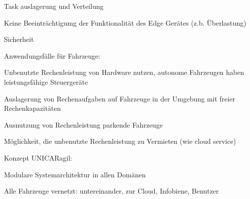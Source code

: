 \begin{notes}
\begin{notes}
\begin{notes}
            \item Task auslagerung und Verteilung
            \item Keine Beeinträchtigumg der Funktionalität des Edge Gerätes (z.b. Überlastung)
            \item Sicherheit
        \end{notes}
        \item Anwendungsfälle für Fahrzeuge:
            \begin{notes}
                \item Unbenutzte Rechenleistung von Hardware nutzen, autonome Fahrzeugen haben leistungsfähige Steuergeräte
                \item Auslagerung von Rechenaufgaben auf Fahrzeuge in der Umgebung mit freier Rechenkapazitäten
                \item Ausnutzung von Rechenleistung parkende Fahrzeuge
                \item Möglichkeit, die unbenutzte Rechenleistung zu Vermieten (wie cloud service)
            \end{notes}
    \end{notes}
    \item Konzept UNICARagil:
        \begin{notes}
            \item Modulare Systemarchitektur in allen Domänen
            \item Alle Fahrzeuge vernetzt: untereinander, zur Cloud, Infobiene, Benutzer 
        \end{notes}
\end{notes} 